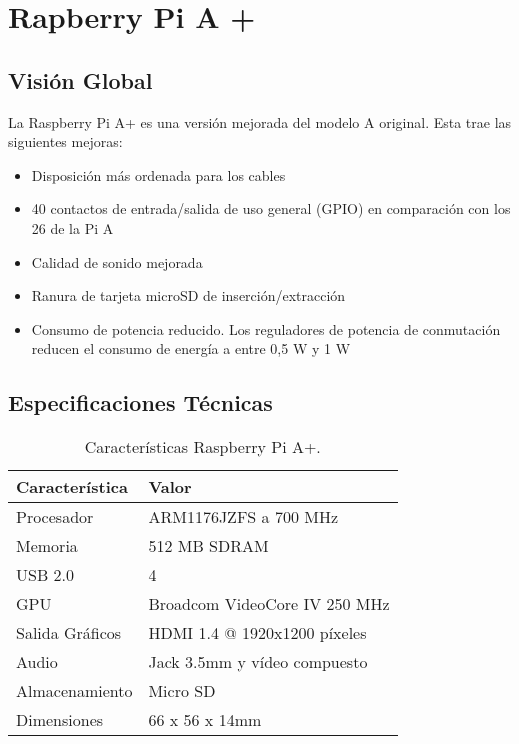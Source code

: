 \chapter{Rapberry Pi A +}
\label{chap:anexo4}

\section{Visión Global}

La Raspberry Pi A+ es una versión mejorada del modelo A original. Esta trae las siguientes mejoras:
\begin{itemize}
\item Disposición más ordenada para los cables
\item 40 contactos de entrada/salida de uso general (GPIO) en comparación con los 26 de la Pi A
\item Calidad de sonido mejorada
\item Ranura de tarjeta microSD de inserción/extracción
\item Consumo de potencia reducido. Los reguladores de potencia de conmutación reducen el consumo de energía a entre 0,5 W y 1 W
\end{itemize}

\section{Especificaciones Técnicas}

\begin{table}[h!]
  \centering
  \caption{Características Raspberry Pi A+. \cite{RaspberryPiAplus}}
  \label{tab:raspberrypiAplus}
  \begin{tabular}{p{}p{}}
    \hline
    \textbf{Característica} & \textbf{Valor} \\
    \hline
    Procesador &  ARM1176JZFS a 700 MHz \\
    Memoria & 512 MB SDRAM \\
    USB 2.0 & 4 \\
    GPU & Broadcom VideoCore IV 250 MHz \\
    Salida Gráficos & HDMI 1.4 @ 1920x1200 píxeles \\
    Audio & Jack 3.5mm y vídeo compuesto \\
    Almacenamiento & Micro SD \\
    Dimensiones & 66 x 56 x 14mm \\
    \hline
  \end{tabular}
\end{table}